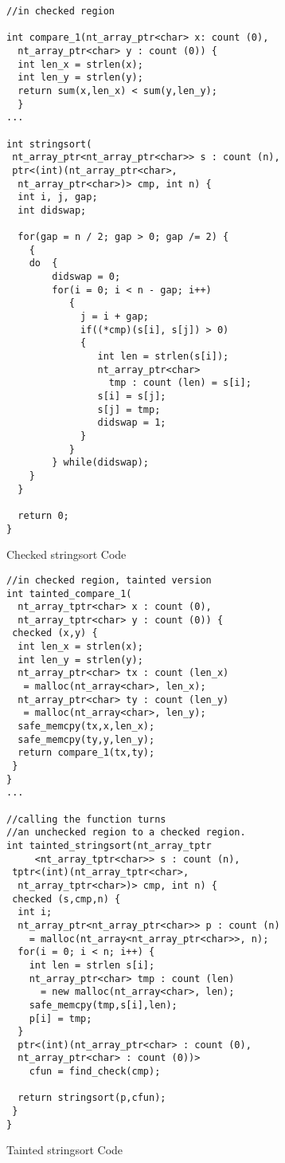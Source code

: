 \begin{figure}[t]
{\small
  \begin{lstlisting}[xleftmargin=4 mm]
//in checked region

int compare_1(nt_array_ptr<char> x: count (0),
  nt_array_ptr<char> y : count (0)) { 
  int len_x = strlen(x);
  int len_y = strlen(y);
  return sum(x,len_x) < sum(y,len_y);
  }
...

int stringsort(
 nt_array_ptr<nt_array_ptr<char>> s : count (n),
 ptr<(int)(nt_array_ptr<char>,
  nt_array_ptr<char>)> cmp, int n) {
  int i, j, gap;
  int didswap;
 
  for(gap = n / 2; gap > 0; gap /= 2) {
    {
    do  {
        didswap = 0;
        for(i = 0; i < n - gap; i++)
           {
             j = i + gap;
             if((*cmp)(s[i], s[j]) > 0)
             {
                int len = strlen(s[i]);
                nt_array_ptr<char> 
                  tmp : count (len) = s[i];
                s[i] = s[j];
                s[j] = tmp;
                didswap = 1;
             }
           }
        } while(didswap);
    }
  }

  return 0;
}
  \end{lstlisting}
}
\caption{Checked stringsort Code}
\label{fig:checkedc-example-1}
\end{figure}

\begin{figure}[t]
{\small
  \begin{lstlisting}[xleftmargin=4 mm]
//in checked region, tainted version
int tainted_compare_1(
  nt_array_tptr<char> x : count (0),
  nt_array_tptr<char> y : count (0)) {
 checked (x,y) {
  int len_x = strlen(x);
  int len_y = strlen(y);
  nt_array_ptr<char> tx : count (len_x)
   = malloc(nt_array<char>, len_x);
  nt_array_ptr<char> ty : count (len_y)
   = malloc(nt_array<char>, len_y);
  safe_memcpy(tx,x,len_x);
  safe_memcpy(ty,y,len_y);
  return compare_1(tx,ty);
 }
}
...

//calling the function turns
//an unchecked region to a checked region.
int tainted_stringsort(nt_array_tptr
     <nt_array_tptr<char>> s : count (n),
 tptr<(int)(nt_array_tptr<char>,
  nt_array_tptr<char>)> cmp, int n) {
 checked (s,cmp,n) {
  int i;
  nt_array_ptr<nt_array_ptr<char>> p : count (n)
    = malloc(nt_array<nt_array_ptr<char>>, n);
  for(i = 0; i < n; i++) {
    int len = strlen s[i];
    nt_array_ptr<char> tmp : count (len)
      = new malloc(nt_array<char>, len);
    safe_memcpy(tmp,s[i],len);
    p[i] = tmp;
  }
  ptr<(int)(nt_array_ptr<char> : count (0),
  nt_array_ptr<char> : count (0))>
    cfun = find_check(cmp);
  
  return stringsort(p,cfun);
 }
}
  \end{lstlisting}
}
\caption{Tainted stringsort Code}
\label{fig:checkedc-example-2}
\end{figure}

